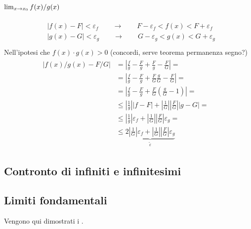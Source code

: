 \documentclass[letterpaper,10pt,italian]{jupyterBook}
\begin{document}
\subsubsection*{\protect\(\lim_{x \rightarrow x_0} f(x) / g(x)\protect\)}
\begin{equation*}
\begin{split}\begin{aligned}
  & |f(x) - F| < \varepsilon_f \qquad \rightarrow \qquad F - \varepsilon_f < f(x) < F + \varepsilon_f \\
  & |g(x) - G| < \varepsilon_g \qquad \rightarrow \qquad G - \varepsilon_g < g(x) < G + \varepsilon_g \\
\end{aligned}\end{split}
\end{equation*}
\sphinxAtStartPar
Nell’ipotesi che \(f(x) \cdot g(x) > 0\) (concordi, serve teorema permanenza segno?)
\begin{equation*}
\begin{split}\begin{aligned}
   |f(x) / g(x) - F / G|
   &   =   \left| \frac{f}{g} - \frac{F}{g} + \frac{F}{g} - \frac{F}{G} \right| = \\
   &   =   \left| \frac{f}{g} - \frac{F}{g} + \frac{F}{G}\frac{g}{G} - \frac{F}{G} \right| = \\
   &   =   \left| \frac{f}{g} - \frac{F}{g} + \frac{F}{G} \left( \frac{g}{G} - 1 \right) \right| = \\
   & \le   \left| \frac{1}{g} \right| |f - F| + \left|\frac{1}{G}\right|\left|\frac{F}{G}\right|\left| g - G \right| = \\
   & \le   \left| \frac{1}{g} \right| \varepsilon_f + \left|\frac{1}{G}\right|\left|\frac{F}{G}\right| \varepsilon_g = \\
   & \le \underbrace{2 \left| \frac{1}{G} \right| \varepsilon_f + \left|\frac{1}{G}\right|\left|\frac{F}{G}\right| \varepsilon_g}_{\tilde{\varepsilon}} 
   & 
\end{aligned}\end{split}
\end{equation*}

\subsection{Contronto di infiniti e infinitesimi}
\label{\detokenize{ch/infinitesimal_calculus/analysis-notes:contronto-di-infiniti-e-infinitesimi}}

\subsection{Limiti fondamentali}
\label{\detokenize{ch/infinitesimal_calculus/analysis-notes:limiti-fondamentali}}\label{\detokenize{ch/infinitesimal_calculus/analysis-notes:infinitesimal-calculus-limits-fund-notes}}
\sphinxAtStartPar
Vengono qui dimostrati i {\hyperref[\detokenize{ch/infinitesimal_calculus/analysis:infinitesimal-calculus-limits-fund}]{}}.
\end{document}
